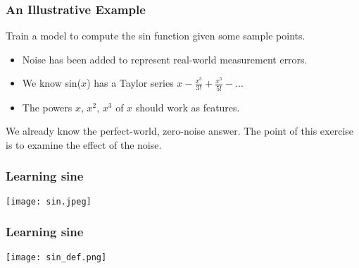 \documentclass[presentation]{beamer}
\begin{document}

\begin{frame}
\frametitle{An Illustrative Example}

Train a model to compute the sin function given some sample points.
\begin{itemize}

\item Noise has been added to represent real-world measurement errors.
\item We know sin($x$) has a Taylor series $x - \frac{x^3}{3!} + \frac{x^5}{5!} - ...$ 
\item The powers $x$, $x^2$, $x^3$ of $x$ should work as features.

\end{itemize}
We already know the perfect-world, zero-noise answer.  The point of this exercise is to examine the effect of the noise.

\end{frame}

\begin{frame}
\frametitle{Learning sine}

\begin{center}
\texttt{[image: sin.jpeg]}
\end{center}

\end{frame}


\begin{frame}
\frametitle{Learning sine}

\begin{center}
\texttt{[image: sin\_def.png]}
\end{center}

\end{frame}

\end{document}
